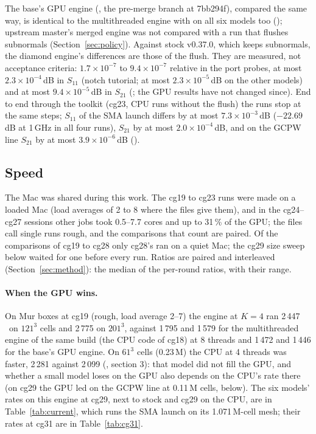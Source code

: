 The base's GPU engine (, the pre-merge branch at 7bb294f), compared the same way, is identical to
the multithreaded engine with  on all six models too (); upstream
master's merged engine was not compared with a run that flushes subnormals (Section~\ref{sec:policy}). Against stock
v0.37.0, which keeps subnormals, the diamond engine's differences are those of the flush. They are measured, not
acceptance criteria: $1.7\times10^{-7}$ to $9.4\times10^{-7}$ relative in the port probes, at most
$2.3\times10^{-4}$\,dB in $S_{11}$ (notch tutorial; at most $2.3\times10^{-5}$\,dB on the other models) and at most
$9.4\times10^{-5}$\,dB in $S_{21}$ (; the GPU results have not changed since). End to end
through the toolkit (cg23, CPU runs without the flush) the runs stop at the same steps; $S_{11}$ of the SMA launch
differs by at most $7.3\times10^{-3}$\,dB ($-22.69$\,dB at 1\,GHz in all four runs), $S_{21}$ by at most
$2.0\times10^{-4}$\,dB, and on the GCPW line $S_{21}$ by at most $3.9\times10^{-6}$\,dB
().

\subsection{Speed}
The Mac was shared during this work. The cg19 to cg23 runs were made on a loaded Mac (load averages of 2 to 8 where
the files give them), and in the cg24--cg27 sessions other jobs took 0.5--7.7 cores and up to 31\,\% of the GPU; the
files call single runs rough, and the comparisons that count are paired. Of the comparisons of cg19 to cg28 only cg28's ran on a quiet Mac; the cg29 size sweep below waited for one before every run. Ratios are paired and interleaved
(Section~\ref{sec:method}): the median of the per-round ratios, with their range.

\paragraph{When the GPU wins.} On Mur boxes at cg19 (rough, load average 2--7) the engine at $K=4$ ran 2\,447\,\MC\ on
$121^3$ cells and 2\,775 on $201^3$, against 1\,795 and 1\,579 for the multithreaded engine of the same build (the CPU
code of cg18) at 8 threads and 1\,472 and 1\,446 for the base's GPU engine. On $61^3$ cells (0.23\,M) the CPU at 4
threads was faster, 2\,281 against 2\,099 (, section 3): that model
did not fill the GPU, and whether a small model loses on the GPU also depends on the CPU's rate there (on cg29 the
GPU led on the GCPW line at 0.11\,M cells, below). The six models' rates on this engine at cg29, next to stock and
cg29 on the CPU, are in
Table~\ref{tab:current}, which runs the SMA launch on its 1.071\,M-cell mesh; their rates at cg31 are in
Table~\ref{tab:cg31}.


